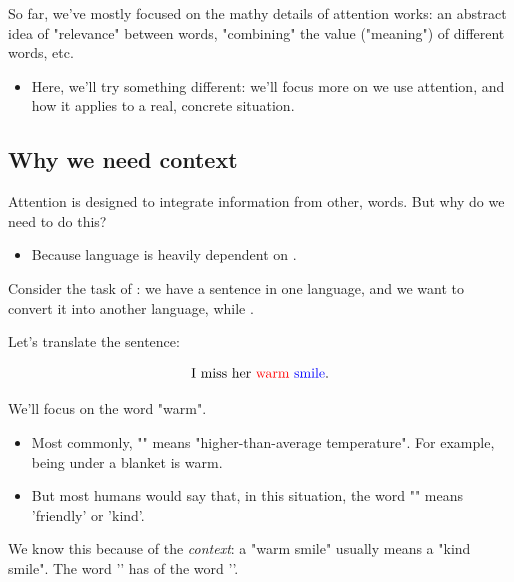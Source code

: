         

        



    \pagebreak

    So far, we've mostly focused on the mathy details of  attention works: an abstract idea of "relevance" between words, "combining" the value ("meaning") of different words, etc.

        \begin{itemize}
            \item Here, we'll try something different: we'll focus more on  we use attention, and how it applies to a real, concrete situation.
        \end{itemize}

    \phantom{}

    \subsection{Why we need context}

        Attention is designed to integrate information from other,  words. But why do we need to do this?

        \begin{itemize}
            \item Because language is heavily dependent on .
        \end{itemize}

        Consider the task of : we have a sentence in one language, and we want to convert it into another language, while .

        Let's translate the sentence:

        $$\text{I miss her \textcolor{red}{warm} \textcolor{blue}{smile}.}$$

        We'll focus on the word "warm". 

        \begin{itemize}
            \item Most commonly, "" means "higher-than-average temperature". For example, being under a blanket is warm.

            \item But most humans would say that, in this situation, the word "" means 'friendly' or 'kind'.
        \end{itemize}
        

        We know this because of the \textit{context}: a "warm smile" usually means a "kind smile". The word '' has  of the word ''.\\


